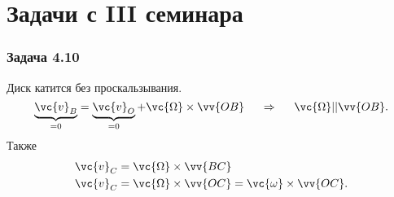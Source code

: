 \section{Задачи с III семинара}
\subsubsection*{\xmark Задача 4.10}



Диск катится без проскальзывания. 
$$
    \underbrace{\vc{v}_B}_{=0} = \underbrace{\vc{v}_O}_{=0} + \vc{\Omega} \times \vv{OB}
    \hspace{0.5cm}\Rightarrow \hspace{0.5cm}\vc{\Omega} || \vv{OB}.
$$
Также
\begin{align*}
    \vc{v}_C &= \vc{\Omega} \times \vv{BC} \\
    \vc{v}_C &= \vc{\Omega} \times \vv{OC} = \vc{\omega} \times \vv{OC}.  
\end{align*}


